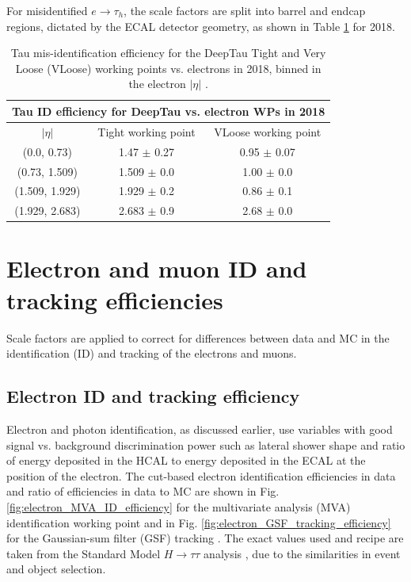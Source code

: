 For misidentified $e \rightarrow \tau_{h}$, the scale factors are split into barrel and endcap regions, dictated by the ECAL detector geometry, as shown in Table \ref{table:tauIDeff_deepTau_vs_electron} for 2018.

\begin{table}[h]
    \centering
    \begin{tabular}{|c|c|c|}
    \hline
    \multicolumn{3}{|c|}{Tau ID efficiency for DeepTau vs. electron WPs in 2018} \\ \hline
    \hline
    $|\eta|$  & Tight working point & VLoose working point \\ \hline
    (0.0, 0.73)     & 1.47 $\pm$ 0.27  & 0.95 $\pm$ 0.07  \\ \hline 
    (0.73, 1.509)   & 1.509 $\pm$ 0.0  & 1.00 $\pm$ 0.0  \\ \hline 
    (1.509, 1.929)  & 1.929 $\pm$ 0.2  & 0.86 $\pm$ 0.1 \\ \hline 
    (1.929, 2.683)  & 2.683 $\pm$ 0.9  & 2.68 $\pm$ 0.0 \\ \hline
    \end{tabular}
    \caption[Tau mis-identification efficiency for the DeepTau Tight and Very Loose (VLoose) working points vs. electrons in 2018.]{Tau mis-identification efficiency for the DeepTau Tight and Very Loose (VLoose) working points vs. electrons in 2018, binned in the electron $|\eta|$ \cite{twiki_TAU_POG_tauidrecommendationforrun2}.}
    \label{table:tauIDeff_deepTau_vs_electron}
\end{table}

\section{Electron and muon ID and tracking efficiencies}
Scale factors are applied to correct for differences between data and MC in the identification (ID) and tracking of the electrons and muons.  

\subsection{Electron ID and tracking efficiency}
Electron and photon identification, as discussed earlier, use variables with good signal vs. background discrimination power such as lateral shower shape and ratio of energy deposited in the HCAL to energy deposited in the ECAL at the position of the electron. The cut-based electron identification efficiencies in data and ratio of efficiencies in data to MC are shown in Fig. \ref{fig:electron_MVA_ID_efficiency} for the multivariate analysis (MVA) identification working point and in Fig. \ref{fig:electron_GSF_tracking_efficiency} for the Gaussian-sum filter (GSF) tracking \cite{CMS-DP-2020-037}. The exact values used and recipe are taken from the Standard Model $H \rightarrow \tau\tau$ analysis \cite{CMS-HIG-19-010}, due to the similarities in event and object selection.

